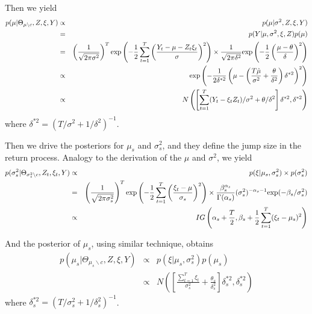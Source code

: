 \documentclass[11pt,reqno,final]{amsart}
\def\exp{\hbox{\rm exp}}
\begin{document}
Then we yield
\begin{eqnarray*}
p(\mu|\Theta_{\mu\backslash c}, Z, \xi, Y) &\propto& p(\mu|\sigma^2, Z, \xi, Y) \\
        &=& p(Y|\mu, \sigma^2, \xi, Z) p(\mu) \\
        &=& \left( \frac{1}{\sqrt{2\pi\sigma^2}} \right)^T \exp\left( -\frac{1}{2} \sum_{t=1}^{T} \left( \frac{Y_t - \mu - Z_t \xi_t}{\sigma}\right)^2 \right) \times \frac{1}{\sqrt{2\pi\delta^2}} \exp\left( -\frac{1}{2} \left( \frac{\mu-\theta}{\delta} \right)^2 \right) \\
        &\propto& \exp\left(-\frac{1}{2\delta^{*2}} \left( \mu-\left(\frac{T\hat{\mu}}{\sigma^2} + \frac{\theta}{\delta^2}\right)\delta^{*2} \right)^2 \right) \\
        &\propto& N\left( \left[ \sum_{t=1}^T (Y_t-\xi_t Z_t) / \sigma^2 + \theta/\delta^2 \right]\delta^{*2}, \delta^{*2} \right)
\end{eqnarray*}
where $\delta^{*2} = (T/\sigma^2+1/\delta^2)^{-1}$.

Then we drive the posteriors for $\mu_s$ and $\sigma_s^2$, and they define the jump size in the return process. Analogy to the derivation of the $\mu$ and $\sigma^2$, we yield
\begin{eqnarray*}
p(\sigma_s^2|\Theta_{\sigma_s^2 \backslash c}, Z_t, \xi_t, Y)  &\propto& p(\xi|\mu_s,\sigma_s^2) \times p(\sigma_s^2) \\
                    &=& \left( \frac{1}{\sqrt{2\pi\sigma_s^2}} \right)^T \exp\left( -\frac{1}{2} \sum_{t=1}^{T} \left( \frac{\xi_t - \mu }{\sigma_s}\right)^2 \right) \times \frac{\beta_s^{\alpha_s}}{\Gamma(\alpha_s)} (\sigma_s^2)^{-\alpha_s-1} \exp(-\beta_s/\sigma_s^2) \\
                    &\propto& IG\left(\alpha_s+\frac{T}{2}, \beta_s+\frac{1}{2}\sum_{t=1}^{T}(\xi_t-\mu_s)^2 \right)
\end{eqnarray*}

And the posterior of $\mu_s$, using similar technique, obtains
\begin{eqnarray*}
p(\mu_s|\Theta_{\mu_s \backslash c}, Z, \xi, Y) &\propto& p(\xi|\mu_s, \sigma_s^2) p(\mu_s) \\
        &\propto& N\left(\left[\frac{\sum_{t=1}^T \xi_t}{\sigma_s^2} + \frac{\theta_s}{\delta_s^2}\right]\delta_s^{*2}, \delta_s^{*2} \right)
\end{eqnarray*}
where $\delta_s^{*2}=(T/\sigma_s^2 + 1/\delta_s^2)^{-1}$.
\end{document}
